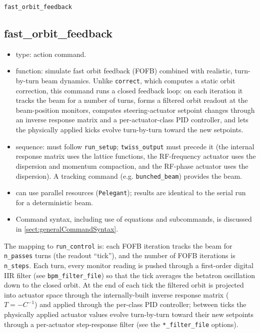 \documentclass[11pt]{article}
\begin{document}
\newpage
\begin{center}{\Large\verb|fast_orbit_feedback|}\end{center}
\subsection{fast\_orbit\_feedback \label{subsec:fastorbitfeedback}}

\begin{itemize}
\item type: action command.
\item function: simulate fast orbit feedback (FOFB) combined with realistic,
  turn-by-turn beam dynamics.  Unlike \verb|correct|, which computes a static orbit
  correction, this command runs a closed feedback loop: on each iteration it tracks the
  beam for a number of turns, forms a filtered orbit readout at the beam-position
  monitors, computes steering-actuator setpoint changes through an inverse response
  matrix and a per-actuator-class PID controller, and lets the physically applied kicks
  evolve turn-by-turn toward the new setpoints.
\item sequence: must follow \verb|run_setup|; \verb|twiss_output| must precede it (the
  internal response matrix uses the lattice functions, the RF-frequency actuator uses
  the dispersion and momentum compaction, and the RF-phase actuator uses the dispersion).  A
  tracking command (e.g. \verb|bunched_beam|)
  provides the beam.
\item can use parallel resources (\verb|Pelegant|); results are identical to the serial
  run for a deterministic beam.
\item Command syntax, including use of equations and subcommands, is discussed in \ref{sect:generalCommandSyntax}.
\end{itemize}

The mapping to \verb|run_control| is: each FOFB iteration tracks the beam for
\verb|n_passes| turns (the readout ``tick''), and the number of FOFB iterations is
\verb|n_steps|.  Each turn, every monitor reading is pushed through a first-order digital
IIR filter (see \verb|bpm_filter_file|) so that the tick averages the betatron
oscillation down to the closed orbit.  At the end of each tick the filtered orbit is
projected into actuator space through the internally-built inverse response matrix
($T=-C^{-1}$) and applied through the per-class PID controller; between ticks the
physically applied actuator values evolve turn-by-turn toward their new setpoints through
a per-actuator step-response filter (see the \verb|*_filter_file| options).
\end{document}
